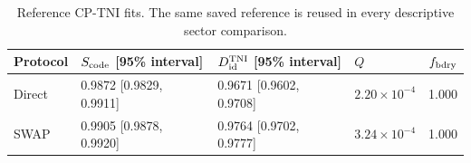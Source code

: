 \documentclass[10pt,a4paper]{article}
\begin{document}
\par\begin{table}[htbp]\centering\footnotesize
\caption{Reference CP-TNI fits. The same saved reference is reused in every descriptive sector comparison.}\label{stab:process_refs}
\begin{tabular}{llllr}\toprule
Protocol & $S_{\rm code}$ [95\% interval] & $D_{\rm id}^{\rm TNI}$ [95\% interval] & $Q$ & $f_{\rm bdry}$\\\midrule
Direct & 0.9872 [0.9829, 0.9911] & 0.9671 [0.9602, 0.9708] & $2.20\times10^{-4}$ & 1.000 \\
SWAP & 0.9905 [0.9878, 0.9920] & 0.9764 [0.9702, 0.9777] & $3.24\times10^{-4}$ & 1.000 \\
\bottomrule\end{tabular}\end{table}\par
\clearpage
\end{document}
